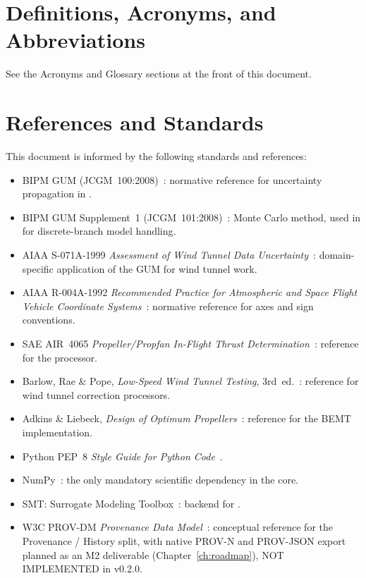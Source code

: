 \section{Definitions, Acronyms, and Abbreviations}

See the Acronyms and Glossary sections at the front of this document.

\section{References and Standards}

This document is informed by the following standards and references:

\begin{itemize}
  \item BIPM GUM (JCGM~100:2008)~\citep{gum2008}: normative reference for
    uncertainty propagation in \itc{}.
  \item BIPM GUM Supplement~1 (JCGM~101:2008)~\citep{gum2008s1}: Monte
    Carlo method, used in \itc{} for discrete-branch model handling.
  \item AIAA S-071A-1999 \emph{Assessment of Wind Tunnel Data
    Uncertainty}~\citep{aiaaS071A}: domain-specific application of the GUM
    for wind tunnel work.
  \item AIAA R-004A-1992 \emph{Recommended Practice for Atmospheric and Space
    Flight Vehicle Coordinate Systems}~\citep{aiaaR004A}: normative
    reference for axes and sign conventions.
  \item SAE AIR~4065 \emph{Propeller/Propfan In-Flight Thrust
    Determination}~\citep{saeAIR4065}: reference for the
     processor.
  \item Barlow, Rae \& Pope, \emph{Low-Speed Wind Tunnel Testing},
    3rd~ed.~\citep{barlowRaePope}: reference for wind tunnel correction
    processors.
  \item Adkins \& Liebeck, \emph{Design of Optimum
    Propellers}~\citep{adkinsLiebeck}: reference for the
     BEMT implementation.
  \item Python PEP~8 \emph{Style Guide for Python Code}~\citep{pep8}.
  \item NumPy~\citep{numpy}: the only mandatory scientific dependency in
    the \itc{} core.
  \item SMT: Surrogate Modeling Toolbox~\citep{smt}: backend for
    .
  \item W3C PROV-DM \emph{Provenance Data Model}~\citep{provdm}: conceptual reference for the Provenance / History split, with native
    PROV-N and PROV-JSON export planned as an M2 deliverable
    (Chapter~\ref{ch:roadmap}), NOT IMPLEMENTED in v0.2.0.
\end{itemize}
